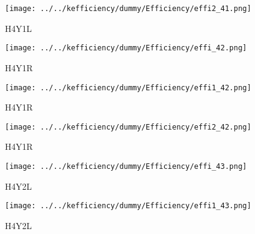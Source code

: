 \documentclass[10pt, xcolor={dvipsnames}, aspectratio = 169]{beamer}
\begin{document}
\begin{frame}

\begin{figure}
\centering
\texttt{[image: ../../kefficiency/dummy/Efficiency/effi2\_41.png]}
\caption{H4Y1L}
\end{figure}

\end{frame}

\begin{frame}

\begin{figure}
\centering
\texttt{[image: ../../kefficiency/dummy/Efficiency/effi\_42.png]}
\caption{H4Y1R}
\end{figure}

\end{frame}

\begin{frame}

\begin{figure}
\centering
\texttt{[image: ../../kefficiency/dummy/Efficiency/effi1\_42.png]}
\caption{H4Y1R}
\end{figure}

\end{frame}

\begin{frame}

\begin{figure}
\centering
\texttt{[image: ../../kefficiency/dummy/Efficiency/effi2\_42.png]}
\caption{H4Y1R}
\end{figure}

\end{frame}

\begin{frame}

\begin{figure}
\centering
\texttt{[image: ../../kefficiency/dummy/Efficiency/effi\_43.png]}
\caption{H4Y2L}
\end{figure}

\end{frame}

\begin{frame}

\begin{figure}
\centering
\texttt{[image: ../../kefficiency/dummy/Efficiency/effi1\_43.png]}
\caption{H4Y2L}
\end{figure}

\end{frame}
\end{document}
